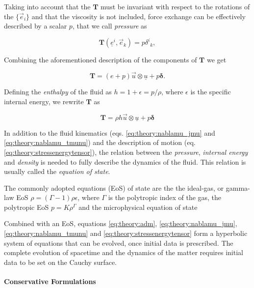 Taking into account that the $\boldsymbol{T}$ must be invariant with respect to the rotations of the $\{\vec{e}_i\}$ and that the viscosity is not included, force exchange can be effectively described by a scalar $p$, that we call \textit{pressure} as

\begin{equation}
\boldsymbol{T}(\underline{e}^i,\vec{e}_k) = p {\delta^i}_k,
\end{equation}

Combining the aforementioned description of the components of $\boldsymbol{T}$ we get

\begin{equation}
\boldsymbol{T} = (e + p)\vec{u}\otimes \underline{u} + p\boldsymbol{\delta}.
\end{equation}

Defining the \textit{enthalpy} of the fluid as $h = 1 + \epsilon = p/\rho$, where $\epsilon$ is the specific internal energy, we rewrite $\boldsymbol{T}$ as 

\begin{equation}
\boldsymbol{T} = \rho h \vec{u}\otimes\underline{u} + p\boldsymbol{\delta}
\label{eq:theory:stressenergytensor}
\end{equation}

In addition to the fluid kinematics (eqs. \ref{eq:theory:nablamu_jmu} and \ref{eq:theory:nablamu_tmunu}) and the description of motion (eq. \ref{eq:theory:stressenergytensor}), the relation between the \textit{pressure}, \textit{internal energy} and \textit{density} is needed to fully describe the dynamics of the fluid. 
This relation is usually called the \textit{equation of state}.

The commonly adopted equations (EoS) of state are the the ideal-gas, or gamma-law EoS $\rho = (\Gamma-1)\rho\epsilon$, where $\Gamma$ is the polytropic index of the gas, the polytropic EoS $p = K\rho^{\Gamma}$ and the microphysical equation of state 

Combined with an EoS, equations \ref{eq:theory:adm}, \ref{eq:theory:nablamu_jmu}, \ref{eq:theory:nablamu_tmunu} and \ref{eq:theory:stressenergytensor} form a hyperbolic
system of equations that can be evolved, once initial data is prescribed. 
The complete evolution of spacetime and the dynamics of the matter requires initial data to be set on the Cauchy surface.


\paragraph{Conservative Formulations}

